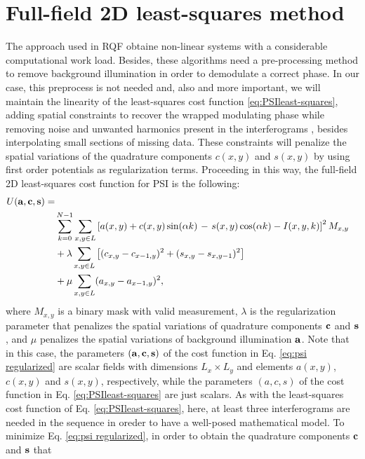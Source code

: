 \section{Full-field 2D least-squares method}

The approach used in RQF obtaine non-linear systems with a
considerable computational work load. Besides, these algorithms need a
pre-processing method to remove background illumination in order to
demodulate a correct phase. In our case, this preprocess is not needed and, also
and more important, we will maintain the linearity of the least-squares cost
function \eqref{eq:PSIleast-squares}, adding spatial constraints to recover the
wrapped modulating phase while removing noise and unwanted harmonics present in
the interferograms \cite{RQF}, besides interpolating small sections of missing
data. These constraints will penalize the spatial variations of the quadrature
components $c(x,y)$ and $s(x,y)$ by using first order potentials as
regularization terms. Proceeding in this way, the full-field 2D
least-squares cost function for PSI is the following:
\begin{align}
  U(\bf{a,c,s})=\nonumber\\
  &\sum_{k=0}^{N-1} \sum_{x,y\in L} \left[a(x,y) + 
  c(x,y)\sin(\alpha k)\right.
  -\left. s(x,y)\cos(\alpha k)-I(x,y,k) \right]^2 M_{x,y}\nonumber \\
  &+\lambda\sum_{x,y\in L}
  \left[(c_{x,y}-c_{x-1,y})^2+(s_{x,y}-s_{x,y-1})^2\right]
  \nonumber\\
  &+\mu\sum_{x,y\in L}(a_{x,y}-a_{x-1,y})^2,
  \label{eq:psi regularized}
\end{align}
where $M_{x,y}$ is a binary mask with valid measurement, $\lambda$ is the
regularization parameter that penalizes the spatial variations of quadrature
components $\bf c$ and $\bf s$, and $\mu$ penalizes the spatial variations of
background illumination $\bf a$. Note that in this case, the parameters
$(\bf{a,c,s})$ of the cost function in Eq. \eqref{eq:psi regularized} are
scalar fields with dimensions $L_x\times L_y$ and elements $a(x,y)$,
$c(x,y)$ and $s(x,y)$, respectively, while the parameters
$(a,c,s)$ of the cost function in Eq. \eqref{eq:PSIleast-squares} are just scalars. As with the least-squares cost
function of Eq. \eqref{eq:PSIleast-squares}, here, at least three
interferograms are needed in the sequence in oreder to have a well-posed
mathematical model. To minimize Eq. \eqref{eq:psi regularized}, in
order to obtain the quadrature components $\bf c$ and $\bf s$ that
